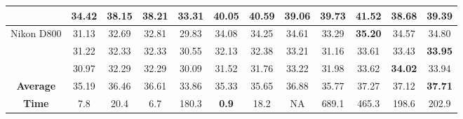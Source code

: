 \begin{table}
\begin{adjustwidth}{-2cm}{}
\begin{center}
\begin{tabular}{|c||c|c|c|c|c|c|c|c|c|c|c|}
\\ 
\cline{2-12}    
& 34.42 & 38.15 & 38.21 & 33.31 & 40.05 & 40.59 & 39.06 & 39.73 & \textbf{41.52} & 38.68 & 39.39
\\ 
\hline
\multirow{3}{*}{Nikon D800} 
& 31.13 & 32.69 & 32.81 & 29.83 & 34.08 & 34.25 & 34.61 & 33.29 & \textbf{35.20} & 34.57 & 34.80
\\ 
\cline{2-12} 
\multirow{3}{*}{ISO = 6400}   
& 31.22 & 32.33 & 32.33 & 30.55 & 32.13 & 32.38  & 33.21 & 31.16 & 33.61 & 33.43 & \textbf{33.95}
\\ 
\cline{2-12}    
& 30.97 & 32.29 & 32.29 & 30.09 & 31.52 & 31.76 & 33.22 & 31.98 & 33.62 & \textbf{34.02} & 33.94
\\
\hline
\textbf{Average} 
& 35.19 & 36.46 & 36.61 & 33.86 & 35.33 & 35.65 & 36.88 & 35.77 & 37.27 & 37.12 & \textbf{ 37.71}
\\
\hline
\textbf{Time} 
& 7.8 & 20.4 & 6.7 & 180.3 & \textbf{0.9} & 18.2 & NA & 689.1 & 465.3 & 198.6 & 202.9
\\
\hline
\end{tabular}
\end{center}
\end{adjustwidth}
\end{table}

